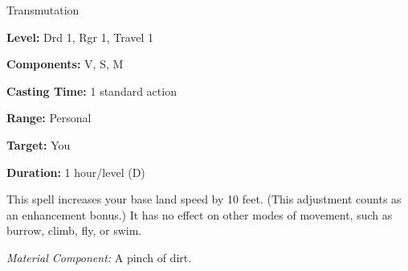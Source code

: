 
Transmutation

\textbf{Level:} Drd 1, Rgr 1, Travel 1

\textbf{Components:} V, S, M

\textbf{Casting Time:} 1 standard action

\textbf{Range:} Personal

\textbf{Target:} You

\textbf{Duration:} 1 hour/level (D)

This spell increases your base land speed by 10 feet. (This adjustment counts as 
an enhancement bonus.) It has no effect on other modes of movement, such as burrow, 
climb, fly, or swim.

\textit{Material Component:} A pinch of dirt.

